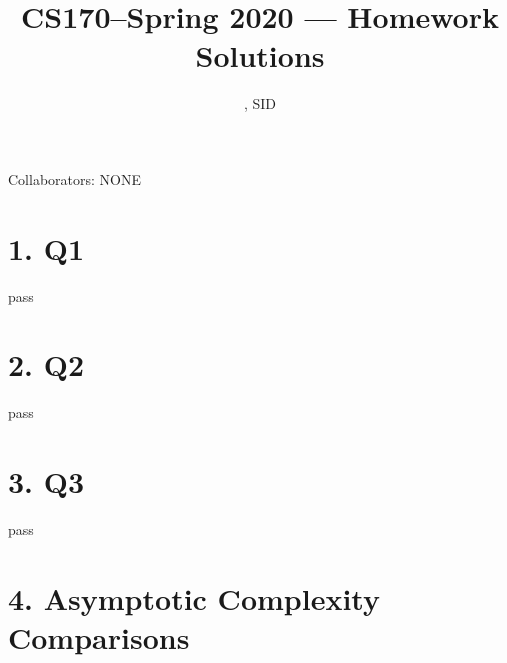 \documentclass[11pt]{article}
\title{CS170--Spring 2020 --- Homework \Homework Solutions}
\author{\Name, SID \SID}
\date{}
\begin{document}
\maketitle

Collaborators: NONE

\section*{1. Q1}
pass
\section*{2. Q2}
pass
\section*{3. Q3}
pass
\section*{4. Asymptotic Complexity Comparisons}
\end{document}
